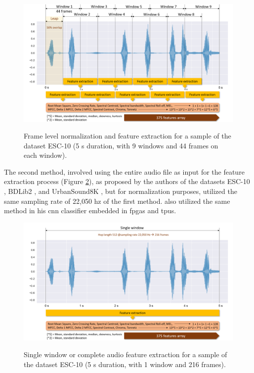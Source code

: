 \begin{figure}[htbp]
    \raggedright
        \caption{Frame level normalization and feature extraction for a sample of the dataset ESC-10 (5 \gls{s} duration, with 9 windows and 44 frames on each window).}
        \includegraphics[width=1\textwidth]{resources/images/050-methods/Methods_feature_extraction_1_BDLib2.png}
        \label{fig:methods_feature_extraction_leap_window}
\end{figure}

The second method, involved using the entire audio file as input for the feature extraction process (Figure \ref{fig:methods_feature_extraction_single_window}), as proposed by the authors of the datasets ESC-10 \cite{PiczakESC2015}, BDLib2 \cite{Bountourakis2015}, and UrbanSound8K \cite{Salamon2017}, but for normalization purposes, utilized the same sampling rate of 22,050 \gls{hz} of the first method. \Textcite{Vandendriessche2021} also utilized the same method in his \gls{cnn} classifier embedded in \gls{fpga}s and \gls{tpu}s.


\begin{figure}[htbp]
    \raggedright
        \caption{Single window or complete audio feature extraction for a sample of the dataset ESC-10 (5 \gls{s} duration, with 1 window and 216 frames).}
        \includegraphics[width=1\textwidth]{resources/images/050-methods/Methods_feature_extraction_2_BDLib2.png}
        \label{fig:methods_feature_extraction_single_window}
\end{figure}

